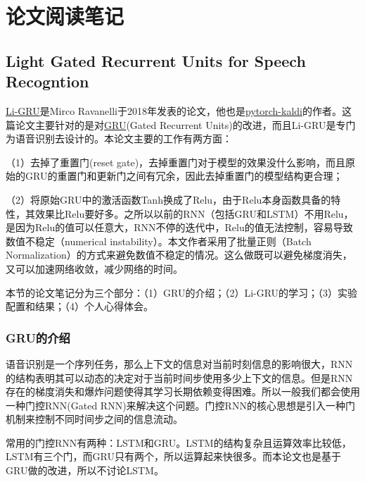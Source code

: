\chapter{论文阅读笔记}

\section{Light Gated Recurrent Units for Speech Recogntion}

\href{https://arxiv.org/abs/1803.10225}{Li-GRU}是Mirco Ravanelli于2018年发表的论文，他也是\href{https://arxiv.org/abs/1811.07453}{pytorch-kaldi}的作者。这篇论文主要针对的是对\href{https://arxiv.org/abs/1406.1078}{GRU}(Gated Recurrent Units)的改进，而且Li-GRU是专门为语音识别去设计的。本论文主要的工作有两方面：

（1）去掉了重置门(reset gate)，去掉重置门对于模型的效果没什么影响，而且原始的GRU的重置门和更新门之间有冗余，因此去掉重置门的模型结构更合理；
  
（2）将原始GRU中的激活函数Tanh换成了Relu，由于Relu本身函数具备的特性，其效果比Relu要好多。之所以以前的RNN（包括GRU和LSTM）不用Relu，是因为Relu的值可以任意大，RNN不停的迭代中，Relu的值无法控制，容易导致数值不稳定（numerical instability）。本文作者采用了批量正则（Batch Normalization）的方式来避免数值不稳定的情况。这么做既可以避免梯度消失，又可以加速网络收敛，减少网络的时间。


本节的论文笔记分为三个部分：（1）GRU的介绍；（2）Li-GRU的学习；（3）实验配置和结果；（4）个人心得体会。

\subsection{GRU的介绍}
\label{sub:gru}
语音识别是一个序列任务，那么上下文的信息对当前时刻信息的影响很大，RNN的结构表明其可以动态的决定对于当前时间步使用多少上下文的信息。但是RNN存在的梯度消失和爆炸问题使得其学习长期依赖变得困难。所以一般我们都会使用一种门控RNN(Gated RNN)来解决这个问题。门控RNN的核心思想是引入一种门机制来控制不同时间步之间的信息流动。

常用的门控RNN有两种：LSTM和GRU。LSTM的结构复杂且运算效率比较低，LSTM有三个门，而GRU只有两个，所以运算起来快很多。而本论文也是基于GRU做的改进，所以不讨论LSTM。

